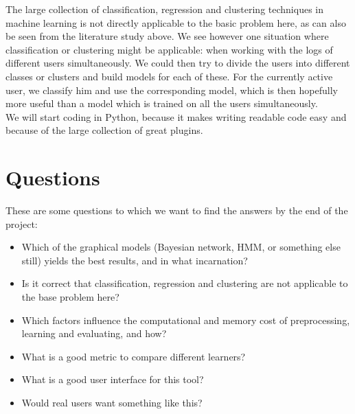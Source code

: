 \documentclass[a4paper,10pt]{article}
\begin{document}
\noindent The large collection of classification, regression and clustering techniques in machine learning is not directly applicable to the basic problem here, as can also be seen from the literature study above. We see however one situation where classification or clustering might be applicable: when working with the logs of different users simultaneously. We could then try to divide the users into different classes or clusters and build models for each of these. For the currently active user, we classify him and use the corresponding model, which is then hopefully more useful than a model which is trained on all the users simultaneously.  \\

\noindent We will start coding in Python, because it makes writing readable code easy and because of the large collection of great plugins.\\


\section{Questions}

These are some questions to which we want to find the answers by the end of the project: 

\begin{itemize}
\item Which of the graphical models (Bayesian network, HMM, or something else still) yields the best results, and in what incarnation?
\item Is it correct that classification, regression and clustering are not applicable to the base problem here?
\item Which factors influence the computational and memory cost of preprocessing, learning and evaluating, and how?
\item What is a good metric to compare different learners?
\item What is a good user interface for this tool?
\item Would real users want something like this?
\end{itemize}




\end{document}

